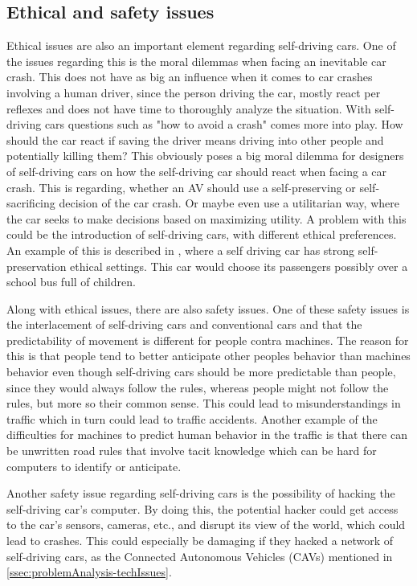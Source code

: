 \subsection{Ethical and safety issues}
Ethical issues are also an important element regarding self-driving cars.
One of the issues regarding this is the moral dilemmas when facing an inevitable car crash.
This does not have as big an influence when it comes to car crashes involving a human driver, since the person driving the car, mostly react per reflexes and does not have time to thoroughly analyze the situation.
With self-driving cars questions such as "how to avoid a crash" comes more into play.
How should the car react if saving the driver means driving into other people and potentially killing them? This obviously poses a big moral dilemma for designers of self-driving cars on how the self-driving car should react when facing a car crash.
This is regarding, whether an AV should use a self-preserving or self-sacrificing decision of the car crash.
Or maybe even use a utilitarian way, where the car seeks to make decisions based on maximizing utility.
A problem with this could be the introduction of self-driving cars, with different ethical preferences.
An example of this is described in \cite{faulhaber_human_2019}, where a self driving car has strong self-preservation ethical settings.
This car would choose its passengers possibly over a school bus full of children.
\cite{faulhaber_human_2019}

Along with ethical issues, there are also safety issues.
One of these safety issues is the interlacement of self-driving cars and conventional cars and that the predictability of movement is different for people contra machines.
The reason for this is that people tend to better anticipate other peoples behavior than machines behavior even though self-driving cars should be more predictable than people, since they would always follow the rules, whereas people might not follow the rules, but more so their common sense.
This could lead to misunderstandings in traffic which in turn could lead to traffic accidents.
Another example of the difficulties for machines to predict human behavior in the traffic is that there can be unwritten road rules that involve tacit knowledge which can be hard for computers to identify or anticipate.
\cite{surden_technological_2016}

Another safety issue regarding self-driving cars is the possibility of hacking the self-driving car's computer.
By doing this, the potential hacker could get access to the car's sensors, cameras, etc., and disrupt its view of the world, which could lead to crashes.
This could especially be damaging if they hacked a network of self-driving cars, as the Connected Autonomous Vehicles (CAVs) mentioned in \autoref{ssec:problemAnalysis-techIssues}.
\cite{fagnant_preparing_2015}

